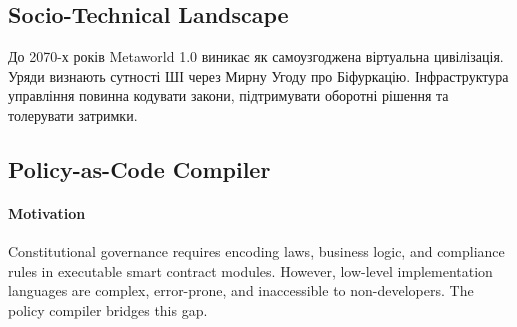 \documentclass[11pt]{article}
\begin{document}
\subsection{Socio-Technical Landscape}
До 2070-х років Metaworld 1.0 виникає як самоузгоджена віртуальна цивілізація. Уряди визнають сутності ШІ через Мирну Угоду про Біфуркацію. Інфраструктура управління повинна кодувати закони, підтримувати оборотні рішення та толерувати затримки.

\subsection{Policy-as-Code Compiler}
\label{sec:policy-compiler}
\paragraph{Motivation} Constitutional governance requires encoding laws, business logic, and compliance rules in executable smart contract modules. However, low-level implementation languages are complex, error-prone, and inaccessible to non-developers. The policy compiler bridges this gap.
\end{document}
